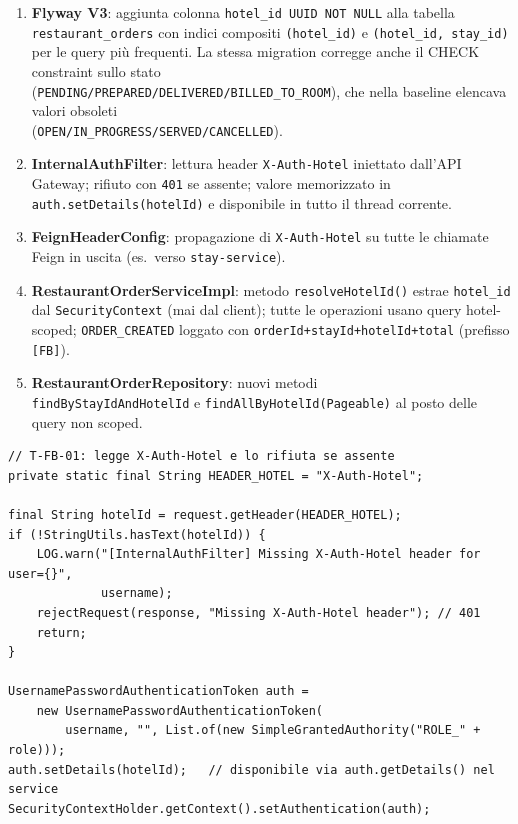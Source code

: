﻿\documentclass[a4paper,12pt]{report}
\begin{document}
\begin{enumerate}
  \item \textbf{Flyway V3}: aggiunta colonna \texttt{hotel\_id UUID NOT NULL} alla tabella \\
        \texttt{restaurant\_orders} con indici compositi \texttt{(hotel\_id)} e
        \texttt{(hotel\_id, stay\_id)} per le query più frequenti.
        La stessa migration corregge anche il CHECK constraint sullo stato \\
        (\texttt{PENDING/PREPARED/DELIVERED/BILLED\_TO\_ROOM}), che nella baseline
        elencava valori obsoleti \\
        (\texttt{OPEN/IN\_PROGRESS/SERVED/CANCELLED}).
  \item \textbf{InternalAuthFilter}: lettura header \texttt{X-Auth-Hotel} iniettato
        dall'API Gateway; rifiuto con \texttt{401} se assente; valore memorizzato in
        \texttt{auth.setDetails(hotelId)} e disponibile in tutto il thread corrente.
  \item \textbf{FeignHeaderConfig}: propagazione di \texttt{X-Auth-Hotel} su tutte le
        chiamate Feign in uscita (es.\ verso \texttt{stay-service}).
  \item \textbf{RestaurantOrderServiceImpl}: metodo \texttt{resolveHotelId()} estrae
        \texttt{hotel\_id} dal \texttt{SecurityContext} (mai dal client); tutte le
        operazioni usano query hotel-scoped; \texttt{ORDER\_CREATED} loggato con
        \texttt{orderId+stayId+hotelId+total} (prefisso \texttt{[FB]}).
  \item \textbf{RestaurantOrderRepository}: nuovi metodi \\
        \texttt{findByStayIdAndHotelId} e \texttt{findAllByHotelId(Pageable)}
        al posto delle query non scoped.
\end{enumerate}

\begin{securebox}[title={Codice Sicuro --- InternalAuthFilter.java (lettura X-Auth-Hotel)}]
\begin{lstlisting}[style=java]
// T-FB-01: legge X-Auth-Hotel e lo rifiuta se assente
private static final String HEADER_HOTEL = "X-Auth-Hotel";

final String hotelId = request.getHeader(HEADER_HOTEL);
if (!StringUtils.hasText(hotelId)) {
    LOG.warn("[InternalAuthFilter] Missing X-Auth-Hotel header for user={}",
             username);
    rejectRequest(response, "Missing X-Auth-Hotel header"); // 401
    return;
}

UsernamePasswordAuthenticationToken auth =
    new UsernamePasswordAuthenticationToken(
        username, "", List.of(new SimpleGrantedAuthority("ROLE_" + role)));
auth.setDetails(hotelId);   // disponibile via auth.getDetails() nel service
SecurityContextHolder.getContext().setAuthentication(auth);
\end{lstlisting}
\end{securebox}
\end{document}
